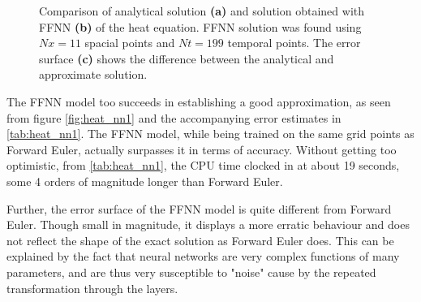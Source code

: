 \begin{figure}[H]
\qquad
{}
\caption{Comparison of analytical solution \textbf{(a)} and solution obtained with FFNN \textbf{(b)} 
of the heat equation. FFNN solution was found using $Nx = 11$ spacial points and $Nt = 199$ temporal points. The error surface \textbf{(c)} shows the difference between the analytical and approximate solution.}
\label{fig:heat_nn1}
\end{figure}

The FFNN model too succeeds in establishing a good approximation, as seen from figure \autoref{fig:heat_nn1} and the accompanying error estimates in \autoref{tab:heat_nn1}. The FFNN model, while being trained on the same grid points as Forward Euler, actually surpasses
it in terms of accuracy. Without getting too optimistic, from \autoref{tab:heat_nn1}, the CPU time clocked in at about 19 seconds, some 4 orders of magnitude longer than Forward Euler.

Further, the error surface of the FFNN model is quite different from Forward Euler. Though small in magnitude, it displays a more erratic behaviour and does not reflect the shape of the exact solution as Forward Euler does. This can be explained by the fact that neural networks are very complex functions of many parameters, and are thus very susceptible to "noise" cause by the repeated transformation through the layers.

